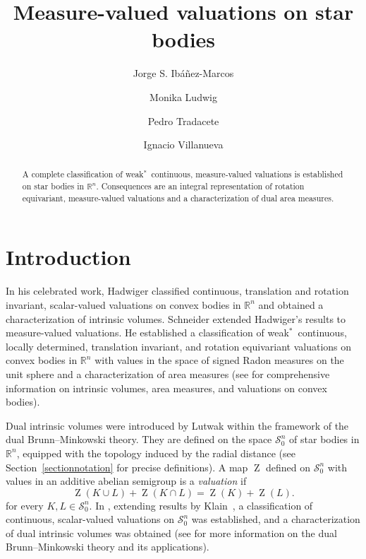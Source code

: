 \documentclass[11pt, a4paper]{amsart}
\title{Measure-valued valuations on star bodies}
\author[J.~S. Ib\'a\~nez-Marcos]{Jorge S. Ib\'a\~nez-Marcos}
\author[M. Ludwig]{Monika Ludwig}
\author[P. Tradacete]{Pedro Tradacete}
\author[I. Villanueva]{Ignacio Villanueva}
\newcommand{\oZ}{\operatorname{Z}}
\newcommand{\starn}{\mathcal S_{\scriptscriptstyle 0}^n}
\newcommand{\R}{\mathbb R}
\begin{document}
\begin{abstract}
A complete classification of weak$^*$~continuous, measure-valued valuations is established on star bodies in  $\R^n$. Consequences are an integral representation of rotation equivariant, measure-valued valuations and a characterization of dual area measures.
\end{abstract}



\maketitle



\section{Introduction} 
In his celebrated work, Hadwiger  \cite{Hadwiger} classified continuous, translation and rotation invariant, scalar-valued valuations on convex bodies in $\mathbb{R}^n$ and obtained a characterization of intrinsic volumes. Schneider  \cite{Schneider:75} extended Hadwiger's results to measure-valued valuations. He established a classification of weak$^*$~continuous, locally determined, translation invariant, and rotation equi\-variant valuations on convex bodies in $\R^n$ with values in the space of signed Radon measures on the unit sphere and a characterization of area measures 
(see  \cite{Schneider} for comprehensive information on intrinsic volumes, area  
measures, and valuations on convex bodies).

Dual intrinsic volumes were introduced by Lutwak \cite{Lutwak75} within the framework of the dual Brunn--Minkowski theory. They are defined on the space $\starn$ of star bodies in $\R^n$, equipped with the topology induced by the radial distance (see Section~\ref{sectionnotation} for precise definitions). 
A map $\oZ$ defined on $\starn$ with values in an additive abelian semigroup is a \emph{valuation}
if 
\begin{equation}\label{eq:val}
\oZ(K\cup L)+\oZ(K\cap L)=\oZ(K)+ \oZ(L).
\end{equation}
for every $K, L\in\starn$. In  \cite{TrViJMAA, TrViIntRep, Vi}, extending results by Klain~\cite{Klain1996, Klain1997}, a classification of continuous, scalar-valued valuations on $\starn$ was established, and a characterization of dual intrinsic volumes was obtained  (see \cite{Gardner, Schneider} for more information on the dual Brunn--Minkowski theory and its applications).
\end{document}
